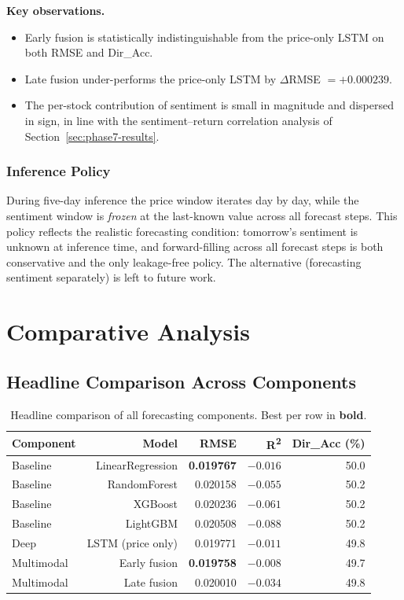 \documentclass[12pt,a4paper,oneside]{report}
\begin{document}
\noindent\textbf{Key observations.}
\begin{itemize}[leftmargin=*,itemsep=2pt]
  \item Early fusion is statistically indistinguishable from the
        price-only \ac{LSTM} on both \ac{RMSE} and Dir\_Acc.
  \item Late fusion under-performs the price-only \ac{LSTM} by
        $\Delta$\ac{RMSE} $= +0.000239$.
  \item The per-stock contribution of sentiment is small in
        magnitude and dispersed in sign, in line with the
        sentiment--return correlation analysis of
        Section~\ref{sec:phase7-results}.
\end{itemize}

\subsubsection{Inference Policy}

During five-day inference the price window iterates day by day,
while the sentiment window is \emph{frozen} at the last-known
value across all forecast steps. This policy reflects the
realistic forecasting condition: tomorrow's sentiment is unknown
at inference time, and forward-filling across all forecast steps
is both conservative and the only leakage-free policy. The
alternative (forecasting sentiment separately) is left to future
work.

\section{Comparative Analysis}

\subsection{Headline Comparison Across Components}
\label{sec:headline}

\begin{table}[H]
  \centering
  \caption{Headline comparison of all forecasting components. Best
  per row in \textbf{bold}.}
  \label{tab:headline}
  \begin{tabular}{lrrrr}
    \toprule
    Component & Model & \ac{RMSE} & R\textsuperscript{2} & Dir\_Acc (\%) \\
    \midrule
    Baseline & LinearRegression        & \textbf{0.019767} & $-0.016$ & 50.0 \\
    Baseline & RandomForest            & 0.020158 & $-0.055$ & 50.2 \\
    Baseline & XGBoost                 & 0.020236 & $-0.061$ & 50.2 \\
    Baseline & LightGBM                & 0.020508 & $-0.088$ & 50.2 \\
    Deep     & \ac{LSTM} (price only)   & 0.019771 & $\mathbf{-0.011}$ & 49.8 \\
    Multimodal & Early fusion          & \textbf{0.019758} & $\mathbf{-0.008}$ & 49.7 \\
    Multimodal & Late fusion           & 0.020010 & $-0.034$ & 49.8 \\
    \bottomrule
  \end{tabular}
\end{table}
\end{document}
